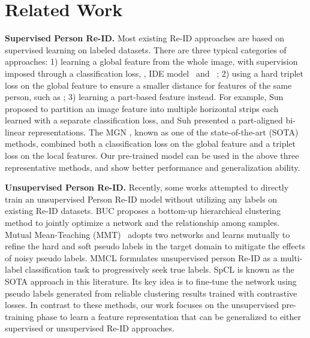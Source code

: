 \documentclass[final]{cvpr}
\begin{document}
\section{Related Work}
\label{sec:related}

\noindent\textbf{Supervised Person Re-ID.} 
Most existing Re-ID approaches are based on supervised learning on labeled datasets. There are three typical categories of approaches: 1) learning a global feature from the whole image, with supervision imposed through a classification loss, \eg, IDE model~\cite{zheng2017person} and ~\cite{shen2018person}; 2) using a hard triplet loss on the global feature to ensure a smaller distance for features of the same person, such as \cite{hermans2017defense}; 3) learning a part-based feature instead. For example, Sun \etal \cite{sun2018PCB} proposed to partition an image feature into multiple horizontal strips each learned with a separate classification loss, and Suh \etal \cite{suh2018part} presented a part-aligned bi-linear representations. The MGN \cite{wang2018learning}, known as one of the state-of-the-art (SOTA) methods, combined both a classification loss on the global feature and a triplet loss on the local features. Our pre-trained model can be used in the above three representative methods, and show better performance and generalization ability. 

\noindent\textbf{Unsupervised Person Re-ID.} 
Recently, some works attempted to directly train an unsupervised Person Re-ID model without utilizing any labels on existing Re-ID datasets. BUC \cite{lin2019bottom} proposes a bottom-up hierarchical clustering method to jointly optimize a network and the relationship among samples. Mutual Mean-Teaching (MMT)~\cite{ge2019mutual} adopts two networks and learns mutually to refine the hard and soft pseudo labels in the target domain to mitigate the effects of noisy pseudo labels. MMCL \cite{wang2020unsupervised} formulates unsupervised person Re-ID as a multi-label classification task to progressively seek true labels. SpCL \cite{ge2020selfpaced} is known as the SOTA approach in this literature. Its key idea is to fine-tune the network using pseudo labels generated from reliable clustering results trained with contrastive losses. In contrast to these methods, our work focuses on the unsupervised pre-training phase to learn a feature representation that can be generalized to either supervised or unsupervised Re-ID approaches. 
\end{document}
